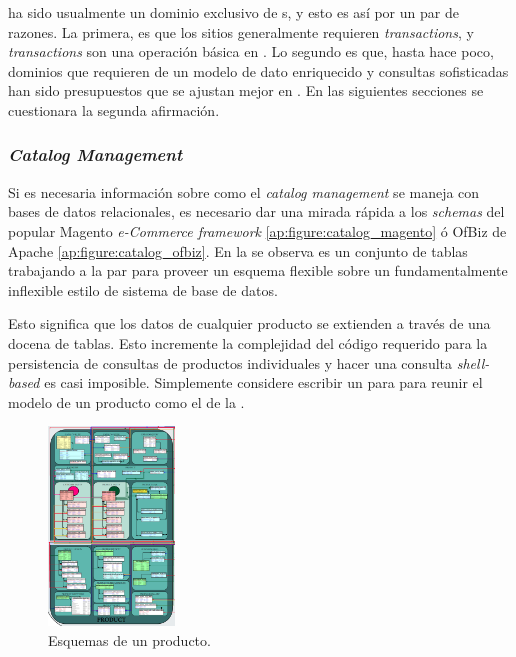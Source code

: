 \textit{} ha sido usualmente un dominio exclusivo de s, y esto es así por un par de razones. La primera, es que los sitios \textit{} generalmente requieren \textit{transactions}, y \textit{transactions} son una operación básica en . Lo segundo es que, hasta hace poco, dominios que requieren de un modelo de dato enriquecido y consultas sofisticadas han sido presupuestos que se ajustan mejor en . En las siguientes secciones se cuestionara la segunda afirmación. 

\subsubsection{\textit{Catalog Management}}

Si es necesaria información sobre como el \textit{catalog management} se maneja con bases de datos relacionales, es necesario dar una mirada rápida a los \textit{schemas} del popular Magento \textit{e-Commerce framework} \ref{ap:figure:catalog_magento} ó OfBiz de Apache \ref{ap:figure:catalog_ofbiz}. En la   se observa es un conjunto de tablas trabajando a la par para proveer un esquema flexible sobre un fundamentalmente inflexible estilo de sistema de base de datos.

Esto significa que los datos de cualquier producto se extienden a través de una docena de tablas. Esto incremente la complejidad del código requerido para la persistencia de consultas de productos individuales y hacer una consulta \textit{shell-based} es casi imposible. Simplemente considere escribir un   para para reunir el modelo de un producto como el de la .

\begin{figure}[h!]
	\centering
	\includegraphics[width=0.3\textwidth]{figuras/cap2/magento_product_schema.png}
	\caption{Esquemas de un producto.}
	\label{cap:figure:catalog_magento}
\end{figure}

